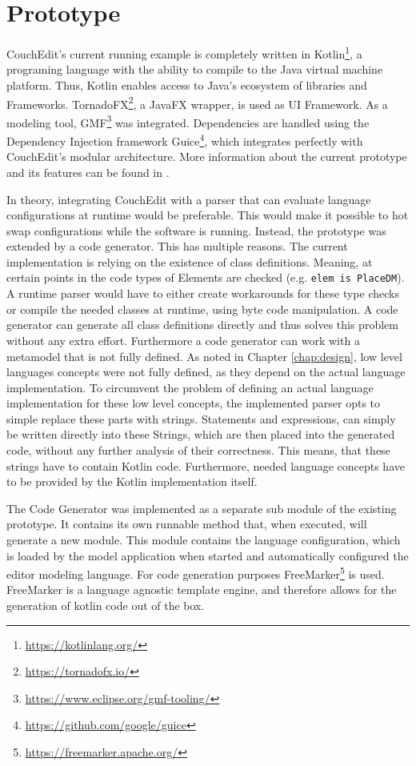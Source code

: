 \chapter{Prototype}
CouchEdit's current running example is completely written in Kotlin\footnote{\url{https://kotlinlang.org/}}, a programing language with the ability to compile to the Java virtual machine platform. Thus, Kotlin enables access to Java's ecosystem of libraries and Frameworks. TornadoFX\footnote{\url{https://tornadofx.io/}}, a JavaFX wrapper, is used as UI Framework. As a modeling tool, GMF\footnote{\url{https://www.eclipse.org/gmf-tooling/}} was integrated. Dependencies are handled using the Dependency Injection framework Guice\footnote{\url{https://github.com/google/guice}}, which integrates perfectly with CouchEdit's modular architecture. More information about the current prototype and its features can be found in \cite{nachreiner_couchedit_2020}.

In theory, integrating CouchEdit with a parser that can evaluate language configurations at runtime would be preferable. This would make it possible to hot swap configurations while the software is running. Instead, the prototype was extended by a code generator. This has multiple reasons. The current implementation is relying on the existence of class definitions. Meaning, at certain points in the code types of Elements are checked (e.g. \texttt{elem is PlaceDM}). A runtime parser would have to either create workarounds for these type checks or compile the needed classes at runtime, using byte code manipulation. A code generator can generate all class definitions directly and thus solves this problem without any extra effort. Furthermore a code generator can work with a metamodel that is not fully defined. As noted in Chapter \ref{chap:design}, low level languages concepts were not fully defined, as they depend on the actual language implementation. To circumvent the problem of defining an actual language implementation for these low level concepts, the implemented parser opts to simple replace these parts with strings. Statements and expressions, can simply be written directly into these Strings, which are then placed into the generated code, without any further analysis of their correctness. This means, that these strings have to contain Kotlin code. Furthermore, needed language concepts have to be provided by the Kotlin implementation itself.

The Code Generator was implemented as a separate sub module of the existing prototype. It contains its own runnable method that, when executed, will generate a new module. This module contains the language configuration, which is loaded by the model application when started and automatically configured the editor modeling language. For code generation purposes FreeMarker\footnote{\url{https://freemarker.apache.org/}} is used. FreeMarker is a language agnostic template engine, and therefore allows for the generation of kotlin code out of the box. 

